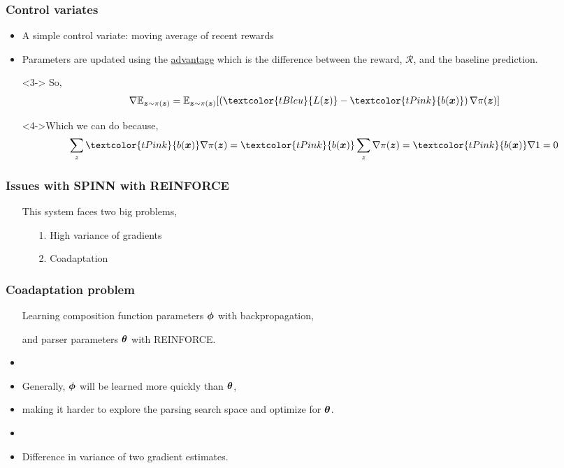 \begin{frame}
\frametitle{Control variates}
\begin{itemize}
\item A simple control variate: moving average of recent rewards
\item<2-> Parameters are updated using the \underline{advantage} which is the difference between the reward, $\mathcal{R}$, and the baseline prediction.
\item[]<3-> So,
\begin{align*}
	\nabla \EE_{\z\sim\pi(\z)} = \EE_{\z\sim \pi(\z)}[\left(\textcolor{tBleu}{L(\z)} - \textcolor{tPink}{b(\bs{x})}\right) \nabla \pi(\z)]
\end{align*}
\item[]<4->Which we can do because,
\begin{align*}
	\sum_z \textcolor{tPink}{b(\bs{x})} \nabla\pi(\z) = \textcolor{tPink}{b(\bs{x})}\sum_z\nabla\pi(\z) = \textcolor{tPink}{b(\bs{x})} \nabla 1 = 0
\end{align*}
\end{itemize}
\end{frame}


\begin{frame}
\frametitle{Issues with SPINN with REINFORCE}
\begin{itemize}
\item[] This system faces two big problems,
\begin{itemize}
\item[] {\large 1. High variance of gradients}
\item[] {\large 2. Coadaptation}
\end{itemize}
\end{itemize}
\end{frame}


\begin{frame}
\frametitle{Coadaptation problem}
\begin{itemize}
\item[] Learning composition function parameters $\boldsymbol{\phi}$ with backpropagation,
\item[] and parser parameters $\boldsymbol{\theta}$ with REINFORCE.
\item<2->[]
\item<2->[] Generally, $\boldsymbol{\phi}$ will be learned more quickly than $\boldsymbol{\theta}$,
 \item<2->[] making it harder to explore the parsing search space and optimize for $\boldsymbol{\theta}$.
\item<3->[]
\item<3->[] Difference in variance of two gradient estimates.
\end{itemize}
\end{frame}


